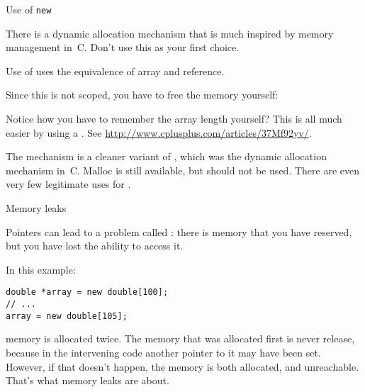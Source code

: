  {Use of \texttt{new}}
\label{sec:cnew}

\prerequisite{\ref{sec:arraypointer}}

There is a dynamic allocation mechanism that is much inspired by
memory management in~C. Don't use this as your first choice.

Use of  uses the 
equivalence of array and reference.
%

Since this is not scoped, you have to free the memory yourself:
%

Notice how you have to remember the array length yourself? This is all
much easier by using a . See
\url{http://www.cplusplus.com/articles/37Mf92yv/}.

The  mechanism is a cleaner variant of ,
which was the dynamic allocation mechanism in~C. Malloc is still
available, but should not be used. There are even very few legitimate
uses for .


 {Memory leaks}
\label{sec:memleak}

Pointers can lead to a problem called :
there is memory that you have reserved, but you have lost the ability
to access it.

In this example:
\begin{lstlisting}
double *array = new double[100];
// ...
array = new double[105];
\end{lstlisting}
memory is allocated twice. The memory that was allocated first is
never release, because in the intervening code another pointer to it
may have been set. However, if that doesn't happen, the memory is both
allocated, and unreachable. That's what memory leaks are about.


